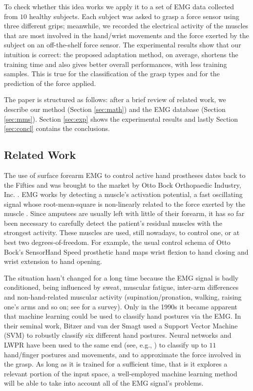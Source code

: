 To check whether this idea works we apply it to a set of
EMG data collected from $10$ healthy subjects. Each subject was asked
to grasp a force sensor 
using three
different grips; meanwhile, we recorded the electrical activity of the
muscles that are most involved in the hand/wrist movements and the
force exerted by the subject on an off-the-shelf force sensor. The
experimental results show that our intuition is correct: the
proposed adaptation method, on average, shortens the training time and
also gives better overall performances, with
less training samples. This is true for the classification of the grasp
types and for the prediction of the force applied. 

The paper is structured as follows: after a brief review of related
work, 
we describe our method (Section \ref{sec:math}) and the EMG database
(Section \ref{sec:mms}). %
Section \ref{sec:exp}
shows the experimental results and lastly Section \ref{sec:concl}
contains the conclusions.

\subsection{Related Work}

The use of surface forearm EMG to control active hand prostheses dates
back to the Fifties and was brought to the market by Otto Bock
Orthopaedic Industry, Inc. \cite{history}. EMG works by detecting a
muscle's activation potential, a fast oscillating signal whose
root-mean-square is non-linearly related to the force exerted by the
muscle \cite{deluca}. Since amputees are usually left with little of
their forearm, it has so far been necessary to carefully detect the
patient's residual muscles with the strongest activity. These muscles
are used, still nowadays, to control one, or at best two
degrees-of-freedom. For example, the usual control schema of Otto
Bock's SensorHand Speed prosthetic hand maps wrist flexion to hand
closing and wrist extension to hand opening.

The situation hasn't changed for a long time because the EMG signal is
badly conditioned, being influenced by sweat, muscular fatigue,
inter-arm differences and non-hand-related muscular activity
(supination/pronation, walking, raising one's arms and so on; see
\cite{zecca} for a survey). Only in the 1990s it became apparent that
machine learning could be used to classify hand postures via the
EMG. In their seminal work, Bitzer and van der Smagt \cite{smagt}
used a Support Vector Machine (SVM) to robustly classify six different
hand postures. Neural networks and LWPR \cite{lwpr} have been used to
the same end (see, e.g., \cite{2008.ICRA,2008.BioCyb,Sebelius2005}) to
classify up to $11$ hand/finger postures and movements, and to
approximate the force involved in the grasp. As long as it is trained
for a sufficient time, that is it explores a relevant portion of the
input space, a well-employed machine learning method will be able to
take into account all of the EMG signal's problems.


